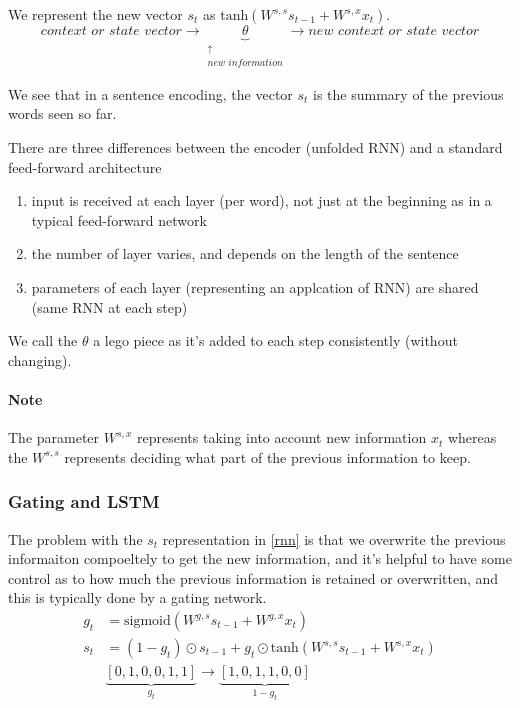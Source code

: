 \documentclass{article}
\begin{document}
We represent the new vector $s_t$ as $\text{tanh}\left(W^{s,s}s_{t-1}+W^{s,x}x_t\right)$\label{rnn}.
\[\textit{context or state vector}\rightarrow\underbrace{\theta}_{\substack{\uparrow\\\textit{new information}}}\rightarrow\textit{new context or state vector}\]

We see that in a sentence encoding, the vector $s_t$ is the summary of the previous words seen so far.

There are three differences between the encoder (unfolded RNN) and a standard feed-forward architecture
\begin{enumerate}
	\item input is received at each layer (per word), not just at the beginning as in a typical feed-forward network
	\item the number of layer varies, and depends on the length of the sentence
	\item parameters of each layer (representing an applcation of RNN) are shared (same RNN at each step)
\end{enumerate}

We call the $\theta$ a lego piece as it's added to each step consistently (without changing).

\paragraph{Note} The parameter $W^{s,x}$ represents taking into account new information $x_t$ whereas the $W^{s,s}$ represents deciding what part of the previous information to keep.

\subsubsection{Gating and LSTM}
The problem with the $s_t$ representation in \ref{rnn} is that we overwrite the previous informaiton compoeltely to get the new information, and it's helpful to have some control as to how much the previous information is retained or overwritten, and this is typically done by a gating network.
\begin{align*}
	g_t&=\text{sigmoid}\left(W^{g,s}s_{t-1}+W^{g,x}x_t\right)\\
	s_t&=(1-g_t)\odot s_{t-1}+g_t\odot\text{tanh}\left(W^{s,s}s_{t-1}+W^{s,x}x_t\right)\\
	&\underbrace{[0,1,0,0,1,1]}_{g_t}\rightarrow\underbrace{[1,0,1,1,0,0]}_{1-g_t}
\end{align*}
\end{document}
